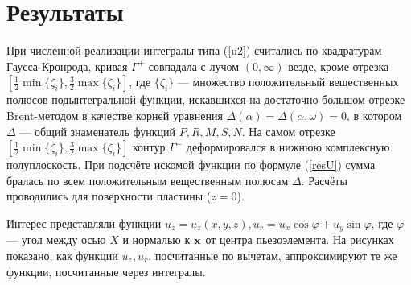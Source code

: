 \documentclass[a4paper, 12pt]{article}
\begin{document}
\section{Результаты}
При численной реализации интегралы типа (\ref{u2}) считались по квадратурам Гаусса-Кронрода,
кривая $\Gamma^+$ совпадала с лучом $(0,\infty)$ везде, кроме отрезка $[\frac{1}{2} \min \{\zeta_i\}, \frac{3}{2} \max \{\zeta_i\}]$,
где $\{\zeta_i \}$ --- множество положительный вещественных полюсов подынтегральной функции,
искавшихся на достаточно большом отрезке Brent-методом в качестве корней уравнения $\Delta(\alpha)=\Delta(\alpha,\omega)=0$, в котором $\Delta$ --- общий знаменатель функций $P,R,M,S,N$.
На самом отрезке $[\frac{1}{2} \min \{\zeta_i\}, \frac{3}{2} \max \{\zeta_i\}]$ контур $\Gamma^+$ деформировался в нижнюю комплексную полуплоскость.
При подсчёте искомой функции по формуле (\ref{resU}) сумма бралась по всем положительным вещественным полюсам $\Delta$.
Расчёты проводились для поверхности пластины ($z=0$).

Интерес представляли функции $u_z=u_z(x,y,z), u_r= u_x \cos \varphi + u_y \sin \varphi$,
где $\varphi$ --- угол между осью $X$ и нормалью к ${\bf x}$ от центра пьезоэлемента.
На рисунках показано, как функции $u_z, u_r$, посчитанные по вычетам, аппроксимируют те же функции, посчитанные через интегралы.
\end{document}
